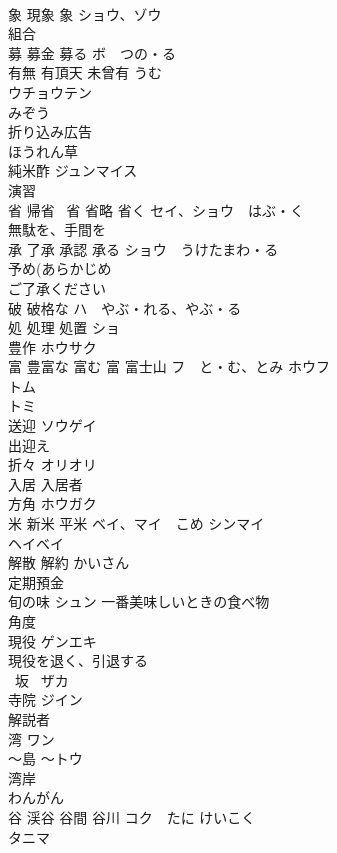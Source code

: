 \documentclass[8pt]{extreport}
\begin{document}
\begin{CJK}{UTF8}{min}
\\	象 現象 象	ショウ、ゾウ 
\\	組合	
\\	募 募金 募る	ボ　つの・る 
\\	有無 有頂天 未曾有	うむ　
\\	ウチョウテン 
\\	みぞう 
\\	折り込み広告	
\\	ほうれん草	
\\	純米酢	ジュンマイス 
\\	演習	
\\	省 帰省 ~省 省略 省く	セイ、ショウ　はぶ・く 
\\	無駄を、手間を
\\	承 了承 承認 承る	ショウ　うけたまわ・る 
\\	予め(あらかじめ 
\\	ご了承ください 
\\	破 破格な	ハ　やぶ・れる、やぶ・る 
\\	処 処理 処置	ショ 
\\	豊作	ホウサク 
\\	富 豊富な 富む 富 富士山	フ　と・む、とみ ホウフ 
\\	トム 
\\	トミ 
\\	送迎	ソウゲイ 
\\	出迎え	
\\	折々	オリオリ 
\\	入居 入居者	
\\	方角	ホウガク 
\\	米 新米 平米	ベイ、マイ　こめ シンマイ 
\\	ヘイベイ 
\\	解散 解約	かいさん 
\\	定期預金	
\\	旬の味	シュン 一番美味しいときの食べ物
\\	角度	
\\	現役	ゲンエキ 
\\	現役を退く、引退する
\\	~坂	~ザカ 
\\	寺院	ジイン 
\\	解説者	
\\	湾	ワン 
\\	〜島	〜トウ
\\	湾岸	
\\	わんがん
\\	谷 渓谷 谷間 谷川	コク　たに けいこく 
\\	タニマ 

\end{CJK}
\end{document}
